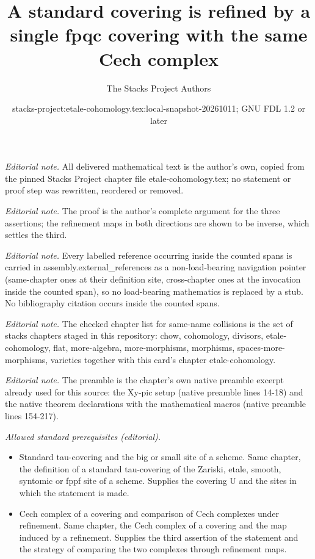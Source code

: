 \documentclass[10pt,a4paper]{amsart}
\title{A standard covering is refined by a single fpqc covering with the same Cech complex}
\author{The Stacks Project Authors}
\date{stacks-project:etale-cohomology.tex:local-snapshot-20261011; GNU FDL 1.2 or later}
\theoremstyle{plain}
\theoremstyle{definition}
\theoremstyle{remark}
\numberwithin{equation}{subsection}
\begin{document}
\maketitle
\noindent\textit{Editorial note.} All delivered mathematical text is the author's own, copied from the pinned Stacks Project chapter file etale-cohomology.tex; no statement or proof step was rewritten, reordered or removed.\par\medskip
\noindent\textit{Editorial note.} The proof is the author's complete argument for the three assertions; the refinement maps in both directions are shown to be inverse, which settles the third.\par\medskip
\noindent\textit{Editorial note.} Every labelled reference occurring inside the counted spans is carried in assembly.external\_references as a non-load-bearing navigation pointer (same-chapter ones at their definition site, cross-chapter ones at the invocation inside the counted span), so no load-bearing mathematics is replaced by a stub. No bibliography citation occurs inside the counted spans.\par\medskip
\noindent\textit{Editorial note.} The checked chapter list for same-name collisions is the set of stacks chapters staged in this repository: chow, cohomology, divisors, etale-cohomology, flat, more-algebra, more-morphisms, morphisms, spaces-more-morphisms, varieties together with this card's chapter etale-cohomology.\par\medskip
\noindent\textit{Editorial note.} The preamble is the chapter's own native preamble excerpt already used for this source: the Xy-pic setup (native preamble lines 14-18) and the native theorem declarations with the mathematical macros (native preamble lines 154-217).\par\medskip
\noindent\textit{Allowed standard prerequisites (editorial).}\begin{itemize}
\item Standard tau-covering and the big or small site of a scheme. Same chapter, the definition of a standard tau-covering of the Zariski, etale, smooth, syntomic or fppf site of a scheme. Supplies the covering U and the sites in which the statement is made.
\item Cech complex of a covering and comparison of Cech complexes under refinement. Same chapter, the Cech complex of a covering and the map induced by a refinement. Supplies the third assertion of the statement and the strategy of comparing the two complexes through refinement maps.
\end{itemize}\medskip
\end{document}
